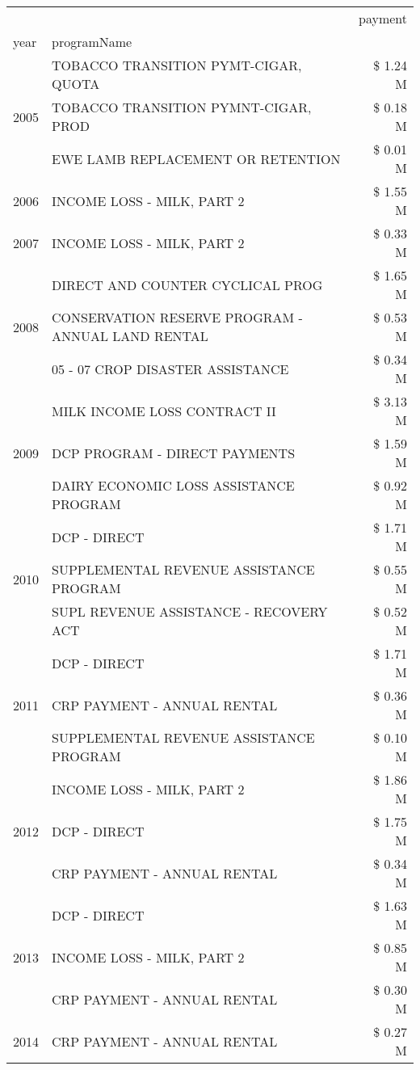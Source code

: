 \begin{tabular}{llr}
\toprule
 &  & payment \\
year & programName &  \\
\midrule
\multirow[t]{3}{*}{2005} & TOBACCO TRANSITION PYMT-CIGAR, QUOTA & \$ 1.24 M \\
 & TOBACCO TRANSITION PYMNT-CIGAR, PROD & \$ 0.18 M \\
 & EWE LAMB REPLACEMENT OR RETENTION & \$ 0.01 M \\
\cline{1-3}
2006 & INCOME LOSS - MILK, PART 2 & \$ 1.55 M \\
\cline{1-3}
2007 & INCOME LOSS - MILK, PART 2 & \$ 0.33 M \\
\cline{1-3}
\multirow[t]{3}{*}{2008} & DIRECT AND COUNTER CYCLICAL PROG & \$ 1.65 M \\
 & CONSERVATION RESERVE PROGRAM - ANNUAL LAND RENTAL & \$ 0.53 M \\
 & 05 - 07 CROP DISASTER ASSISTANCE & \$ 0.34 M \\
\cline{1-3}
\multirow[t]{3}{*}{2009} & MILK INCOME LOSS CONTRACT II & \$ 3.13 M \\
 & DCP PROGRAM - DIRECT PAYMENTS & \$ 1.59 M \\
 & DAIRY ECONOMIC LOSS ASSISTANCE PROGRAM & \$ 0.92 M \\
\cline{1-3}
\multirow[t]{3}{*}{2010} & DCP - DIRECT & \$ 1.71 M \\
 & SUPPLEMENTAL REVENUE ASSISTANCE PROGRAM & \$ 0.55 M \\
 & SUPL REVENUE ASSISTANCE - RECOVERY ACT & \$ 0.52 M \\
\cline{1-3}
\multirow[t]{3}{*}{2011} & DCP - DIRECT & \$ 1.71 M \\
 & CRP PAYMENT - ANNUAL RENTAL & \$ 0.36 M \\
 & SUPPLEMENTAL REVENUE ASSISTANCE PROGRAM & \$ 0.10 M \\
\cline{1-3}
\multirow[t]{3}{*}{2012} & INCOME LOSS - MILK, PART 2 & \$ 1.86 M \\
 & DCP - DIRECT & \$ 1.75 M \\
 & CRP PAYMENT - ANNUAL RENTAL & \$ 0.34 M \\
\cline{1-3}
\multirow[t]{3}{*}{2013} & DCP - DIRECT & \$ 1.63 M \\
 & INCOME LOSS - MILK, PART 2 & \$ 0.85 M \\
 & CRP PAYMENT - ANNUAL RENTAL & \$ 0.30 M \\
\cline{1-3}
\multirow[t]{3}{*}{2014} & CRP PAYMENT - ANNUAL RENTAL & \$ 0.27 M \\

\end{tabular}
